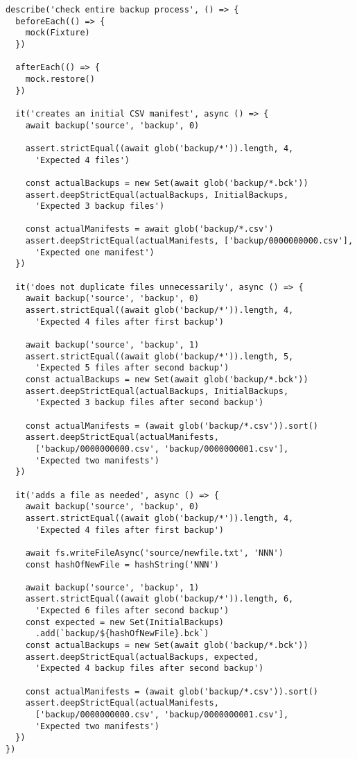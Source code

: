 \documentclass[krantzl]{krantz}
\begin{document}
\begin{lstlisting}[frame=tblr]
describe('check entire backup process', () => {
  beforeEach(() => {
    mock(Fixture)
  })

  afterEach(() => {
    mock.restore()
  })

  it('creates an initial CSV manifest', async () => {
    await backup('source', 'backup', 0)

    assert.strictEqual((await glob('backup/*')).length, 4,
      'Expected 4 files')

    const actualBackups = new Set(await glob('backup/*.bck'))
    assert.deepStrictEqual(actualBackups, InitialBackups,
      'Expected 3 backup files')

    const actualManifests = await glob('backup/*.csv')
    assert.deepStrictEqual(actualManifests, ['backup/0000000000.csv'],
      'Expected one manifest')
  })

  it('does not duplicate files unnecessarily', async () => {
    await backup('source', 'backup', 0)
    assert.strictEqual((await glob('backup/*')).length, 4,
      'Expected 4 files after first backup')

    await backup('source', 'backup', 1)
    assert.strictEqual((await glob('backup/*')).length, 5,
      'Expected 5 files after second backup')
    const actualBackups = new Set(await glob('backup/*.bck'))
    assert.deepStrictEqual(actualBackups, InitialBackups,
      'Expected 3 backup files after second backup')

    const actualManifests = (await glob('backup/*.csv')).sort()
    assert.deepStrictEqual(actualManifests,
      ['backup/0000000000.csv', 'backup/0000000001.csv'],
      'Expected two manifests')
  })

  it('adds a file as needed', async () => {
    await backup('source', 'backup', 0)
    assert.strictEqual((await glob('backup/*')).length, 4,
      'Expected 4 files after first backup')

    await fs.writeFileAsync('source/newfile.txt', 'NNN')
    const hashOfNewFile = hashString('NNN')

    await backup('source', 'backup', 1)
    assert.strictEqual((await glob('backup/*')).length, 6,
      'Expected 6 files after second backup')
    const expected = new Set(InitialBackups)
      .add(`backup/${hashOfNewFile}.bck`)
    const actualBackups = new Set(await glob('backup/*.bck'))
    assert.deepStrictEqual(actualBackups, expected,
      'Expected 4 backup files after second backup')

    const actualManifests = (await glob('backup/*.csv')).sort()
    assert.deepStrictEqual(actualManifests,
      ['backup/0000000000.csv', 'backup/0000000001.csv'],
      'Expected two manifests')
  })
})
\end{lstlisting}
\end{document}
